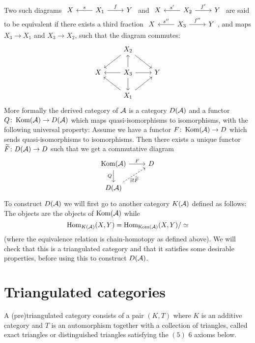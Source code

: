 \documentclass[a4paper, UKenglish]{report}
\begin{document}
Two such diagrams $\begin{tikzcd}X & \arrow[l, "s", swap] X_1 \arrow[r, "f"] & Y \end{tikzcd}$ and $\begin{tikzcd}X & \arrow[l, "s'", swap] X_2 \arrow[r, "f'"] & Y \end{tikzcd}$ are said to be equivalent if there exists a third fraction $\begin{tikzcd}X & \arrow[l, "s''", swap] X_3 \arrow[r, "f''"] & Y \end{tikzcd}$, and maps $X_3 \to X_1$ and $X_3 \to X_2$, such that the diagram commutes:
\[
    \begin{tikzcd}
        &    X_2 \arrow{dl} \arrow{dr} & \\
        X  & X_3 \arrow{l}  \arrow{r}  \arrow{u} \arrow{d} & Y \\
        &    X_1 \arrow{ul} \arrow{ur} & 
    \end{tikzcd} 
\]
More formally the derived category of $\mathcal{A}$ is a category $D(\mathcal{A})$ and a functor $Q \colon \operatorname{Kom}(\mathcal{A}) \to D(\mathcal{A})$ which maps quasi-isomorphisms to isomorphisms, with the following universal property: Assume we have a functor $F \colon \operatorname{Kom} (\mathcal{A}) \to D$ which sends quasi-isomorphisms to isomorphisms. Then there exists a unique functor $\widetilde{F} \colon D(\mathcal{A}) \to D$ such that we get a commutative diagram
\[
    \begin{tikzcd}
        \Kom(\AAA) \arrow[d, "Q"{left}] \ar{r}{F} & D \\
        D(\AAA) \arrow[ur, dashed, "\exists ! \widetilde{F}"{below}] &
    \end{tikzcd}
\]
To construct $D(\mathcal{A})$ we will first go to another category $K(\mathcal{A})$ defined as follows: The objects are the objects of $\operatorname{Kom}(\mathcal{A})$ while 
\[
    \operatorname{Hom}_{K(\mathcal{A})}(X,Y) = \operatorname{Hom}_{\operatorname{Kom}(\mathcal{A})}(X,Y) / \simeq
\]
(where the equivalence relation is chain-homotopy as defined above). We will check that this is a triangulated category and that it satisfies some desirable properties, before using this to construct $D(\mathcal{A})$.

\section{Triangulated categories}

A (pre)triangulated category consists of a pair $(K,T)$ where $K$ is an additive category and $T$ is an automorphism together with a collection of triangles, called exact triangles or distinguished triangles satisfying the $(5)$ $6$ axioms below.
\end{document}
